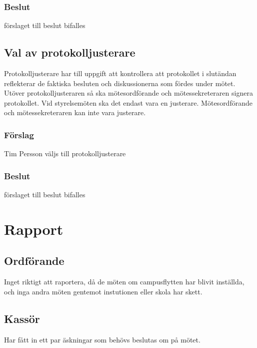 \documentclass[protokoll]{dvd}
\begin{document}
\subsubsection*{Beslut}
\begin{attsatser}
    \item förslaget till beslut bifalles
\end{attsatser}

\subsection{Val av protokolljusterare}

Protokolljusterare har till uppgift att kontrollera att protokollet i slutändan reflekterar de faktiska besluten och diskussionerna som fördes under mötet.
Utöver protokolljusteraren så ska mötesordförande och mötessekreteraren signera protokollet.
Vid styrelsemöten ska det endast vara en justerare.
Mötesordförande och mötessekreteraren kan inte vara justerare.

\subsubsection*{Förslag}
\begin{attsatser}
    \item Tim Persson väljs till protokolljusterare
\end{attsatser}
\subsubsection*{Beslut}
\begin{attsatser}
    \item förslaget till beslut bifalles
\end{attsatser}

\section{Rapport}
\subsection{Ordförande}
Inget riktigt att raportera, då de möten om campusflytten har blivit inställda, och
inga andra möten gentemot instutionen eller skola har skett.

\subsection{Kassör}
Har fått in ett par äskningar som behövs beslutas om på mötet.
\end{document}
